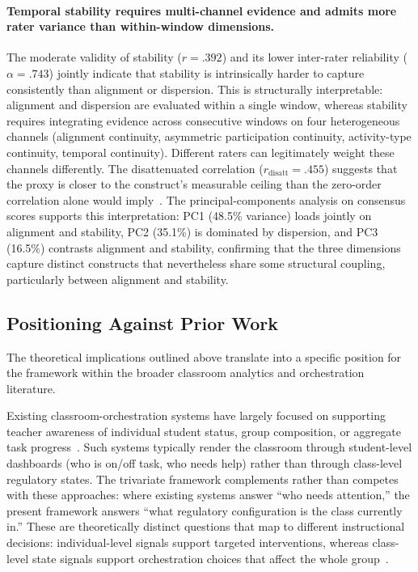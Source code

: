 \documentclass[preprint,12pt,authoryear]{elsarticle}
\begin{document}
\paragraph{Temporal stability requires multi-channel evidence and admits more rater variance than within-window dimensions.}
The moderate validity of stability ($r = .392$) and its lower inter-rater reliability ($\alpha = .743$) jointly indicate that stability is intrinsically harder to capture consistently than alignment or dispersion. This is structurally interpretable: alignment and dispersion are evaluated within a single window, whereas stability requires integrating evidence across consecutive windows on four heterogeneous channels (alignment continuity, asymmetric participation continuity, activity-type continuity, temporal continuity). Different raters can legitimately weight these channels differently. The disattenuated correlation ($r_{\mathrm{disatt}} = .455$) suggests that the proxy is closer to the construct's measurable ceiling than the zero-order correlation alone would imply~\citep{molenaar2021, nguyen2023}. The principal-components analysis on consensus scores supports this interpretation: PC1 (48.5\% variance) loads jointly on alignment and stability, PC2 (35.1\%) is dominated by dispersion, and PC3 (16.5\%) contrasts alignment and stability, confirming that the three dimensions capture distinct constructs that nevertheless share some structural coupling, particularly between alignment and stability.

\subsection{Positioning Against Prior Work}
\label{sec:discuss_prior}

The theoretical implications outlined above translate into a specific position for the framework within the broader classroom analytics and orchestration literature.

Existing classroom-orchestration systems have largely focused on supporting teacher awareness of individual student status, group composition, or aggregate task progress~\citep{feng2023, amarasinghe2020, martinezmaldonado2019, holstein2019, cukurova2022}. Such systems typically render the classroom through student-level dashboards (who is on/off task, who needs help) rather than through class-level regulatory states. The trivariate framework complements rather than competes with these approaches: where existing systems answer ``who needs attention,'' the present framework answers ``what regulatory configuration is the class currently in.'' These are theoretically distinct questions that map to different instructional decisions: individual-level signals support targeted interventions, whereas class-level state signals support orchestration choices that affect the whole group~\citep{olsen2021, vanleeuwen2019}.
\end{document}
